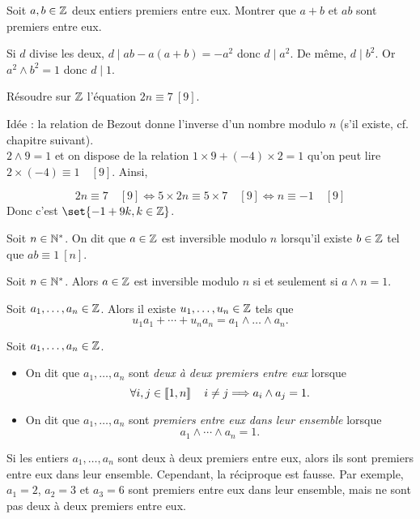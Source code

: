 \documentclass{magnolia}
\begin{document}
\begin{exos}
\exo Soit $a,b\in\mathbb{Z}$ deux entiers premiers entre eux. Montrer que $a+b$ et
  $ab$ sont premiers entre eux.
  \begin{sol}
  Si $d$ divise les deux, $d\mid ab-a(a+b)=-a^2$ donc $d\mid a^2$. De même, $d\mid b^2$. Or $a^2\wedge b^2=1$ donc $d\mid 1$.
  \end{sol}
\exo Résoudre sur $\mathbb{Z}$ l'équation $2n\equiv 7\ [9]$.
\begin{sol}
Idée : la relation de Bezout donne l'inverse d'un nombre modulo $n$ (s'il existe, cf. chapitre suivant).\\
$2\wedge 9=1$ et on dispose de la relation $1\times 9+(-4)\times 2=1$ qu'on peut lire $2\times (-4)\equiv 1 \quad [9]$. Ainsi,

$$2n\equiv 7\quad [9] \Longleftrightarrow 5\times 2n\equiv 5\times 7\quad [9] \Longleftrightarrow n \equiv -1 \quad [9]$$
Donc c'est $\set{-1+9k, k\in \Z}$.
\end{sol}
\end{exos}

\begin{definition}
Soit $n\in{\mathbb{N}^*}$. On dit que $a\in\mathbb{Z}$ est inversible modulo $n$ lorsqu'il existe $b\in\mathbb{Z}$
tel que $ab\equiv 1\ [n]$.
\end{definition}

\begin{proposition}
Soit $n\in{\mathbb{N}^*}$. Alors $a\in\mathbb{Z}$ est inversible modulo $n$ si et seulement si $a\wedge n=1$.
\end{proposition}


\begin{proposition}
Soit $a_1,\ldots,a_n\in\mathbb{Z}$. Alors il existe $u_1,\ldots,u_n\in\mathbb{Z}$ tels que
\[u_1 a_1+\cdots+u_n a_n = a_1\wedge \ldots\wedge a_n.\]
\end{proposition}


\begin{definition}
Soit $a_1,\ldots,a_n\in\mathbb{Z}$.
\begin{itemize}
\item On dit que $a_1,\ldots,a_n$ sont \emph{deux à deux premiers entre eux} lorsque
  \[\forall i,j\in\left\llbracket 1,n\right\rrbracket \quad i\neq j \Longrightarrow a_i\wedge a_j=1.\]
\item On dit que $a_1,\ldots,a_n$ sont \emph{premiers entre eux dans leur ensemble} lorsque
  \[a_1\wedge\cdots\wedge a_n=1.\]
\end{itemize}
\end{definition}

\begin{remarqueUnique}
\remarque Si les entiers $a_1,\ldots,a_n$ sont deux à deux premiers entre eux, alors
  ils sont premiers entre eux dans leur ensemble. Cependant, la réciproque est fausse.
  Par exemple, $a_1=2$, $a_2=3$ et $a_3=6$
  sont premiers entre eux dans leur ensemble, mais ne sont pas deux à deux premiers
  entre eux.
\end{remarqueUnique}
\end{document}
